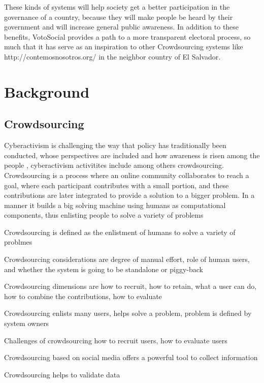 \documentclass[a4paper,10pt]{article}
\begin{document}
These kinds of systems will help society get a better participation in the governance of a country, because they will make people be heard by their government and will increase general public awareness. In addition to these benefits, VotoSocial provides a path to a more transparent electoral process, so much that it has serve as an inspiration to other Crowdsourcing systems like http://contemosnosotros.org/ in the neighbor country of El Salvador. 



\section{Background}
\subsection{Crowdsourcing}

Cyberactivism is challenging the way that policy has traditionally been conducted, whose perspectives are included and how awareness is risen among the people \cite{milan2013}, cyberactivism activitites include among others crowdsourcing. Crowdsourcing is a process where an online community collaborates to reach a goal, where each participant contributes with a small portion, and these contributions are later integrated to provide a solution to a bigger problem. In a manner it builds a big solving machine using humans as computational components, thus enlisting people to solve a variety of problems \cite{doan2011}




Crowdsourcing is defined as the enlistment of humans to solve a variety of problmes \cite{doan2011}

Crowdsourcing considerations  are degree of manual effort, role of human users, and whether the system is going to be standalone or piggy-back \cite{doan2011}

Crowdsourcing dimensions are how to recruit, how to retain, what a user can do, how to combine the contributions, how to evaluate \cite{doan2011}

Crowdsourcing enlists many users, helps solve a problem, problem is defined by system owners \cite{doan2011}

Challenges of crowdsourcing how to recruit users, how to evaluate users \cite{doan2011}

Crowdsourcing based on social media offers a powerful tool to collect information \cite{gao2011}

Crowdsourcing helps to validate data \cite{gao2011}
\end{document}
